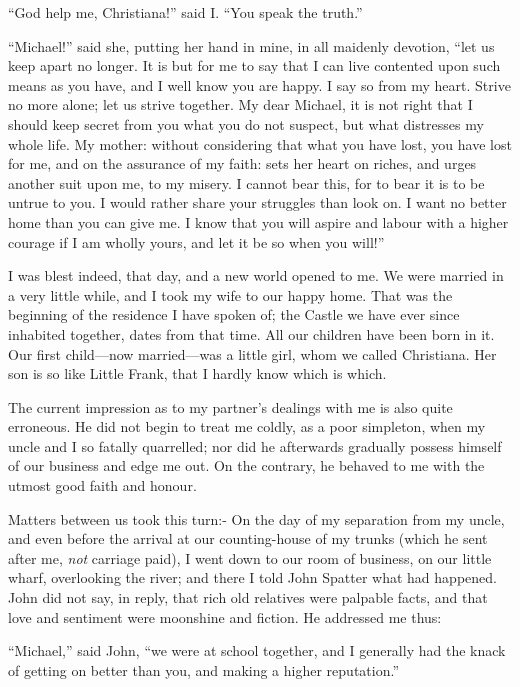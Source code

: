 ``God help me, Christiana!'' said I.  ``You speak the truth.''

``Michael!'' said she, putting her hand in mine, in all maidenly
devotion, ``let us keep apart no longer.  It is but for me to say
that I can live contented upon such means as you have, and I well
know you are happy.  I say so from my heart.  Strive no more alone;
let us strive together.  My dear Michael, it is not right that I
should keep secret from you what you do not suspect, but what
distresses my whole life.  My mother:  without considering that what
you have lost, you have lost for me, and on the assurance of my
faith:  sets her heart on riches, and urges another suit upon me, to
my misery.  I cannot bear this, for to bear it is to be untrue to
you.  I would rather share your struggles than look on.  I want no
better home than you can give me.  I know that you will aspire and
labour with a higher courage if I am wholly yours, and let it be so
when you will!''

I was blest indeed, that day, and a new world opened to me.  We were
married in a very little while, and I took my wife to our happy
home.  That was the beginning of the residence I have spoken of; the
Castle we have ever since inhabited together, dates from that time.
All our children have been born in it.  Our first child---now
married---was a little girl, whom we called Christiana.  Her son is
so like Little Frank, that I hardly know which is which.


The current impression as to my partner's dealings with me is also
quite erroneous.  He did not begin to treat me coldly, as a poor
simpleton, when my uncle and I so fatally quarrelled; nor did he
afterwards gradually possess himself of our business and edge me
out.  On the contrary, he behaved to me with the utmost good faith
and honour.

Matters between us took this turn:- On the day of my separation from
my uncle, and even before the arrival at our counting-house of my
trunks (which he sent after me, \emph{not} carriage paid), I went down to
our room of business, on our little wharf, overlooking the river;
and there I told John Spatter what had happened.  John did not say,
in reply, that rich old relatives were palpable facts, and that love
and sentiment were moonshine and fiction.  He addressed me thus:

``Michael,'' said John, ``we were at school together, and I generally
had the knack of getting on better than you, and making a higher
reputation.''

